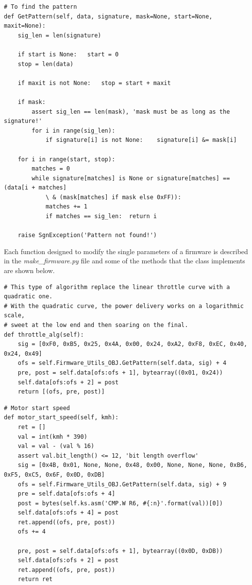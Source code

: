 \documentclass[binding=0.6cm,LaM,noexaminfo]{sapthesis}
\begin{document}
\begin{lstlisting}[language=iPython, firstnumber=39]
# To find the pattern
def GetPattern(self, data, signature, mask=None, start=None, maxit=None):
	sig_len = len(signature)

	if start is None:	start = 0
	stop = len(data)

	if maxit is not None:	stop = start + maxit

	if mask:
		assert sig_len == len(mask), 'mask must be as long as the signature!'
		for i in range(sig_len):
			if signature[i] is not None:	signature[i] &= mask[i]

	for i in range(start, stop):
		matches = 0
		while signature[matches] is None or signature[matches] == (data[i + matches]
		    \ & (mask[matches] if mask else 0xFF)):
			matches += 1
			if matches == sig_len:	return i

	raise SgnException('Pattern not found!')
\end{lstlisting}

\vspace{15pt}
Each function designed to modify the single parameters of a firmware is described in the \textit{make\_firmware.py} file and some of the methods that the class implements are shown below.

\begin{lstlisting}[language=iPython, firstnumber=35]
# This type of algorithm replace the linear throttle curve with a quadratic one.
# With the quadratic curve, the power delivery works on a logarithmic scale, 
# sweet at the low end and then soaring on the final.
def throttle_alg(self):
    sig = [0xF0, 0xB5, 0x25, 0x4A, 0x00, 0x24, 0xA2, 0xF8, 0xEC, 0x40, 0x24, 0x49]
    ofs = self.Firmware_Utils_OBJ.GetPattern(self.data, sig) + 4
    pre, post = self.data[ofs:ofs + 1], bytearray((0x01, 0x24))
    self.data[ofs:ofs + 2] = post
    return [(ofs, pre, post)]
\end{lstlisting}

\begin{lstlisting}[language=iPython, firstnumber=62]
# Motor start speed
def motor_start_speed(self, kmh):
    ret = []
    val = int(kmh * 390)
    val = val - (val % 16)
    assert val.bit_length() <= 12, 'bit length overflow'
    sig = [0x4B, 0x01, None, None, 0x48, 0x00, None, None, None, 0xB6, 0xF5, 0xC5, 0x6F, 0x0D, 0xDB]
    ofs = self.Firmware_Utils_OBJ.GetPattern(self.data, sig) + 9
    pre = self.data[ofs:ofs + 4]
    post = bytes(self.ks.asm('CMP.W R6, #{:n}'.format(val))[0])
    self.data[ofs:ofs + 4] = post
    ret.append((ofs, pre, post))
    ofs += 4

    pre, post = self.data[ofs:ofs + 1], bytearray((0x0D, 0xDB))
    self.data[ofs:ofs + 2] = post
    ret.append((ofs, pre, post))
    return ret
\end{lstlisting}
\end{document}
